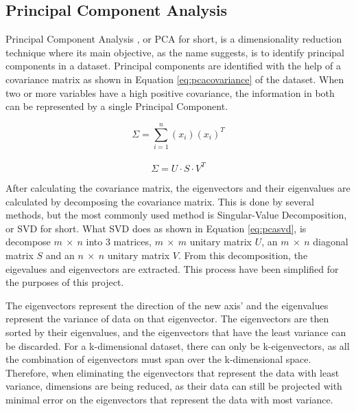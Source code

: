 \subsection{Principal Component Analysis}\label{ssec:pca}
Principal Component Analysis \cite{tipping1999probabilistic}, or PCA for short, is a dimensionality reduction technique where its main objective, as the name suggests, is to identify principal components in a dataset. Principal components are identified with the help of a covariance matrix as shown in Equation \eqref{eq:pcacovariance} of the dataset. When two or more variables have a high positive covariance, the information in both can be represented by a single Principal Component.

\begin{multicols}{2}
    \begin{equation} \label{eq:pcacovariance}
        \Sigma = \sum\limits_{i=1}^{n} (x_i) (x_i) ^T
    \end{equation} 
    \\ 
    \begin{equation} \label{eq:pcasvd}
       \Sigma = U \cdot S \cdot V^T
    \end{equation}
\end{multicols}

\noindent After calculating the covariance matrix, the eigenvectors and their eigenvalues are calculated by decomposing the covariance matrix. This is done by several methods, but the most commonly used method is Singular-Value Decomposition, or SVD for short. What SVD does as shown in Equation \eqref{eq:pcasvd}, is decompose $m \ \times \ n$ into 3 matrices, $m \ \times \ m$ unitary matrix $U$, an $m \ \times \ n$ diagonal matrix $S$ and an $n \ \times \ n$ unitary matrix $V$. From this decomposition, the eigevalues and eigenvectors are extracted. This process have been simplified for the purposes of this project. 

\noindent The eigenvectors represent the direction of the new axis’ and the eigenvalues represent the variance of data on that eigenvector. The eigenvectors are then sorted by their eigenvalues, and the eigenvectors that have the least variance can be discarded. For a k-dimensional dataset, there can only be k-eigenvectors, as all the combination of eigenvectors must span over the k-dimensional space. Therefore, when eliminating the eigenvectors that represent the data with least variance, dimensions are being reduced, as their data can still be projected with minimal error on the eigenvectors that represent the data with most variance.